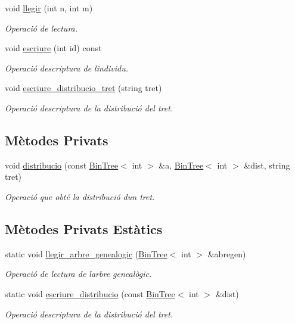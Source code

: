 \begin{DoxyCompactItemize}
void \hyperlink{class_cjt__individus_a478b829d6a11c5259a36a8bd53662e7d}{llegir} (int n, int m)
\begin{DoxyCompactList}\small\item\em Operació de lectura. \end{DoxyCompactList}\item 
void \hyperlink{class_cjt__individus_aafb2e0f4456390cbe83009aa542b0991}{escriure} (int id) const 
\begin{DoxyCompactList}\small\item\em Operació d\textquotesingle{}escriptura de l\textquotesingle{}individu. \end{DoxyCompactList}\item 
void \hyperlink{class_cjt__individus_afbd2a5f911caa9d9ca05470781c395a2}{escriure\+\_\+distribucio\+\_\+tret} (string tret)
\begin{DoxyCompactList}\small\item\em Operació d\textquotesingle{}escriptura de la distribució del tret. \end{DoxyCompactList}\end{DoxyCompactItemize}
\subsection*{Mètodes Privats}
\begin{DoxyCompactItemize}
\item 
void \hyperlink{class_cjt__individus_a569a1232f6660f888176cacd07df134a}{distribucio} (const \hyperlink{class_bin_tree}{Bin\+Tree}$<$ int $>$ \&a, \hyperlink{class_bin_tree}{Bin\+Tree}$<$ int $>$ \&dist, string tret)
\begin{DoxyCompactList}\small\item\em Operació que obté la distribució d\textquotesingle{}un tret. \end{DoxyCompactList}\end{DoxyCompactItemize}
\subsection*{Mètodes Privats Estàtics}
\begin{DoxyCompactItemize}
\item 
static void \hyperlink{class_cjt__individus_af4d73e9f298f7fab8411f2485a7c8fc5}{llegir\+\_\+arbre\+\_\+genealogic} (\hyperlink{class_bin_tree}{Bin\+Tree}$<$ int $>$ \&abregen)
\begin{DoxyCompactList}\small\item\em Operació de lectura de l\textquotesingle{}arbre genealògic. \end{DoxyCompactList}\item 
static void \hyperlink{class_cjt__individus_ac72868ef20cbed360206829ff580c38c}{escriure\+\_\+distribucio} (const \hyperlink{class_bin_tree}{Bin\+Tree}$<$ int $>$ \&dist)
\begin{DoxyCompactList}\small\item\em Operació d\textquotesingle{}escriptura de la distribució del tret. \end{DoxyCompactList}\end{DoxyCompactItemize}

